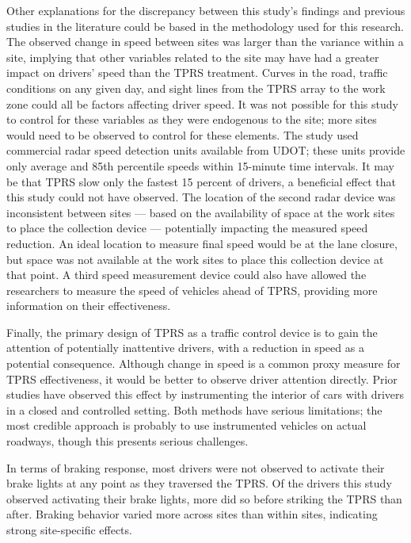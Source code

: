 \documentclass[
  letterpaper,
]{trb}
\begin{document}
Other explanations for the discrepancy between this study's findings and
previous studies in the literature could be based in the methodology
used for this research. The observed change in speed between sites was
larger than the variance within a site, implying that other variables
related to the site may have had a greater impact on drivers' speed than
the TPRS treatment. Curves in the road, traffic conditions on any given
day, and sight lines from the TPRS array to the work zone could all be
factors affecting driver speed. It was not possible for this study to
control for these variables as they were endogenous to the site; more
sites would need to be observed to control for these elements. The study
used commercial radar speed detection units available from UDOT; these
units provide only average and 85th percentile speeds within 15-minute
time intervals. It may be that TPRS slow only the fastest 15 percent of
drivers, a beneficial effect that this study could not have observed.
The location of the second radar device was inconsistent between sites
--- based on the availability of space at the work sites to place the
collection device --- potentially impacting the measured speed
reduction. An ideal location to measure final speed would be at the lane
closure, but space was not available at the work sites to place this
collection device at that point. A third speed measurement device could
also have allowed the researchers to measure the speed of vehicles ahead
of TPRS, providing more information on their effectiveness.

Finally, the primary design of TPRS as a traffic control device is to
gain the attention of potentially inattentive drivers, with a reduction
in speed as a potential consequence. Although change in speed is a
common proxy measure for TPRS effectiveness, it would be better to
observe driver attention directly. Prior studies have observed this
effect by instrumenting the interior of cars with drivers in a closed
and controlled setting. Both methods have serious limitations; the most
credible approach is probably to use instrumented vehicles on actual
roadways, though this presents serious challenges.

In terms of braking response, most drivers were not observed to activate
their brake lights at any point as they traversed the TPRS. Of the
drivers this study observed activating their brake lights, more did so
before striking the TPRS than after. Braking behavior varied more across
sites than within sites, indicating strong site-specific effects.
\end{document}
